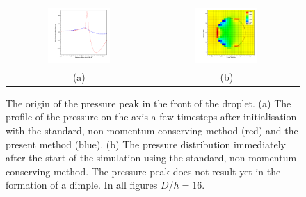 \begin{figure}
\begin{center}
\begin{tabular}{cc}
\includegraphics[width=0.45\textwidth]{Figures/Sagar/16ppd_MC_vc_NON-MC.png} &
\includegraphics[width=0.45\textwidth]
{Figures/Sagar/non_MC_16ppd_pressure_corrected.png}\\
(a) & (b)
\end{tabular}
\end{center}
\caption{The origin of the pressure peak in the front of the droplet. 
(a) The profile of the pressure on the axis a few timesteps after initialisation 
with the standard, non-momentum conserving method (red) and the present method 
(blue). (b) The pressure distribution immediately after the start of the simulation 
using the standard, non-momentum-conserving method. The pressure peak does
not result yet in the formation of a dimple. In all figures  $D/h = 16$.}
\label{FengXiao}
\end{figure}

